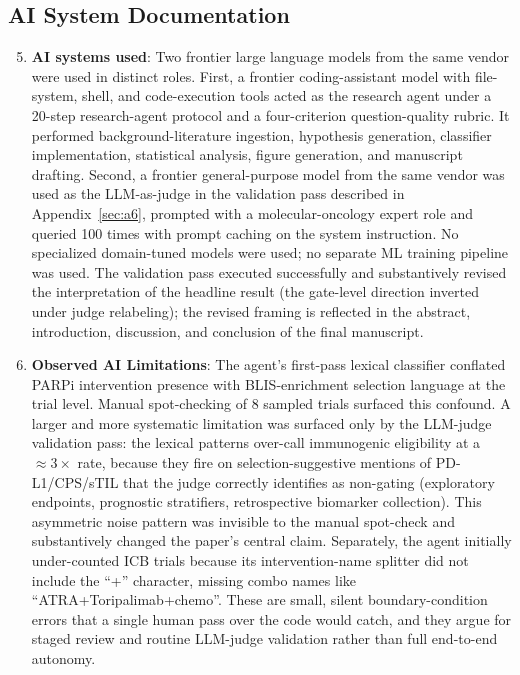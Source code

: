 \documentclass{article}
\begin{document}
\subsection*{AI System Documentation}

\begin{enumerate}
  \setcounter{enumi}{4}

  \item \textbf{AI systems used}: Two frontier large language
  models from the same vendor were used in distinct roles.  First,
  a frontier coding-assistant model with file-system, shell, and
  code-execution tools acted as the research agent under a 20-step
  research-agent protocol and a four-criterion question-quality
  rubric.  It performed background-literature ingestion, hypothesis
  generation, classifier implementation, statistical analysis,
  figure generation, and manuscript drafting.  Second, a frontier
  general-purpose model from the same vendor was used as the
  LLM-as-judge in the validation pass described in
  Appendix~\ref{sec:a6}, prompted with a molecular-oncology expert
  role and queried 100 times with prompt caching on the system
  instruction.  No specialized domain-tuned models were used; no
  separate ML training pipeline was used.  The validation pass
  executed successfully and substantively revised the interpretation
  of the headline result (the gate-level direction inverted under
  judge relabeling); the revised framing is reflected in the
  abstract, introduction, discussion, and conclusion of the final
  manuscript.

  \item \textbf{Observed AI Limitations}: The agent's first-pass
  lexical classifier conflated PARPi intervention presence with
  BLIS-enrichment selection language at the trial level.  Manual
  spot-checking of 8 sampled trials surfaced this confound.  A
  larger and more systematic limitation was surfaced only by the
  LLM-judge validation pass: the lexical patterns over-call
  immunogenic eligibility at a $\approx 3\times$ rate, because
  they fire on selection-suggestive mentions of PD-L1/CPS/sTIL
  that the judge correctly identifies as non-gating (exploratory
  endpoints, prognostic stratifiers, retrospective biomarker
  collection).  This asymmetric noise pattern was invisible to the
  manual spot-check and substantively changed the paper's central
  claim.  Separately, the agent initially under-counted ICB trials
  because its intervention-name splitter did not include the ``+''
  character, missing combo names like ``ATRA+Toripalimab+chemo''.
  These are small, silent boundary-condition errors that a single
  human pass over the code would catch, and they argue for staged
  review and routine LLM-judge validation rather than full
  end-to-end autonomy.

\end{enumerate}
\end{document}
